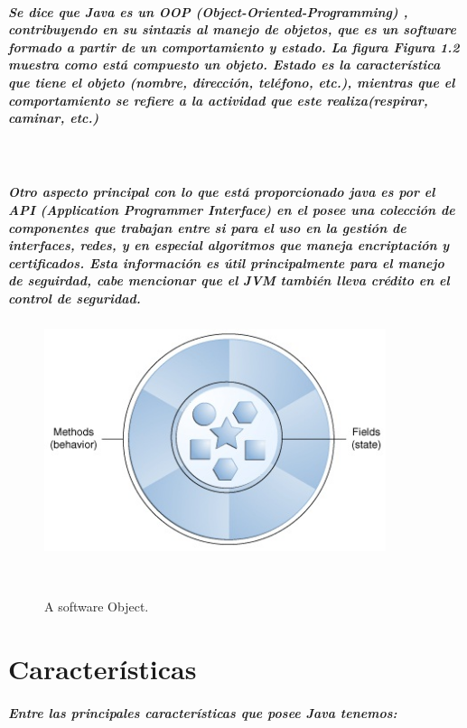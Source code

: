 \documentclass[12pt]{book} %
\begin{document}
\paragraph{Se dice que Java es un OOP (Object-Oriented-Programming) \cite{oop}, contribuyendo en su sintaxis al manejo de objetos, que es un software formado a partir de un comportamiento y estado. La figura \textsl{Figura 1.2} muestra como est\'a compuesto un objeto. \textsl{Estado} es la caracter\'istica que tiene el objeto (nombre, direcci\'on, tel\'efono, etc.), mientras que el \textsl{comportamiento} se refiere a la actividad que este realiza(respirar, caminar, etc.)}~\\

\paragraph{Otro aspecto principal con lo que est\'a proporcionado java es por el API (Application Programmer Interface) en el posee una colecci\'on de componentes que trabajan entre si para el uso en la gesti\'on de interfaces, redes, y en especial algoritmos que maneja encriptaci\'on y certificados. Esta informaci\'on es \'util principalmente para el manejo de seguirdad, cabe mencionar que el JVM tambi\'en lleva cr\'edito en el control de seguridad.}

\begin{figure}[h!]
		\centering
			\includegraphics[width=10cm]{conceptsobject.jpg}
			\caption{A software Object.}~\\[1.4cm]
		
\end{figure}


\chapter{Características}
\paragraph{Entre las principales caracter\'isticas que posee Java tenemos:}
\end{document}
